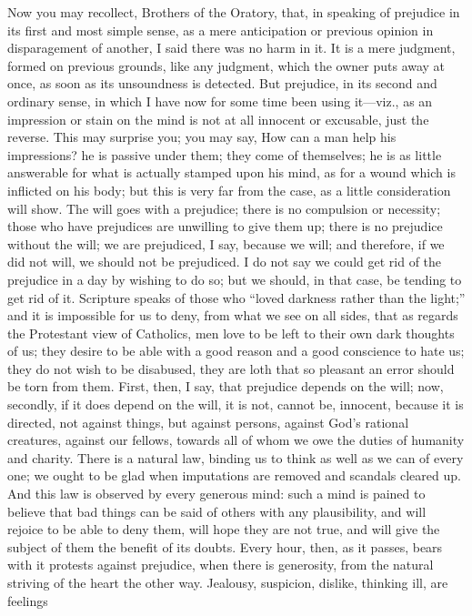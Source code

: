 Now you may recollect, Brothers of the Oratory, that,
in speaking of prejudice in its first and most simple
sense, as a mere anticipation or previous opinion in
disparagement of another, I said there was no harm in it.
It is a mere judgment, formed on previous grounds, like
any judgment, which the owner puts away at once, as soon
as its unsoundness is detected. But prejudice, in its
second and ordinary sense, in which I have now for some
time been using it—viz., as an impression or stain
on the mind is not at all innocent or excusable, just the
reverse. This may surprise you; you may say, How can a
man help his impressions? he is passive under them; they
come of themselves; he is as little answerable for what
is actually stamped upon his mind, as for a wound which
is inflicted on his body; but this is very far from the
case, as a little consideration will show. The will goes
with a prejudice; there is no compulsion or necessity;
those who have prejudices are unwilling to give them up;
there is no prejudice without the will; we are
prejudiced, I say, because we will; and therefore, if we
did not will, we should not be prejudiced. I do not say
we could get rid of the prejudice in a day by wishing to
do so; but we should, in that case, be tending to get rid
of it. Scripture speaks of those who ``loved darkness
rather than the light;'' and it is impossible for us
to deny, from what we see on all sides, that as regards
the Protestant view of Catholics, men love to be left to
their own dark thoughts of us; they desire to be able
with a good reason and a good conscience to hate us; they
do not wish to be disabused, they are loth that so
pleasant an error should be torn from them. First, then,
I say, that prejudice depends on the will; now, secondly,
if it does depend on the will, it is not, cannot be,
innocent, because it is directed, not against things, but
against persons, against God's rational creatures,
against our fellows, towards all of whom we owe the
duties of humanity and charity. There is a natural law,
binding us to think as well as we can of every one; we
ought to be glad when imputations are removed and
scandals cleared up. And this law is observed by every
generous mind: such a mind is pained to believe that bad
things can be said of others with any plausibility, and
will rejoice to be able to deny them, will hope they are
not true, and will give the subject of them the benefit
of its doubts. Every hour, then, as it passes, bears with
it protests against prejudice, when there is generosity,
from the natural striving of the heart the other way.
Jealousy, suspicion, dislike, thinking ill, are feelings
